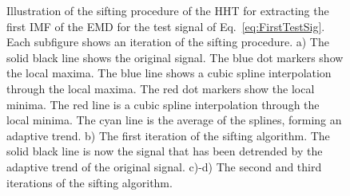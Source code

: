 \documentclass[a4paper]{IEEEtran}
\begin{document}
\begin{figure}[ht]
	\centering
	\label{fig:HHTDemo}
	\caption{Illustration of the sifting procedure of the HHT for extracting the first IMF of the EMD for the test signal of Eq.~\ref{eq:FirstTestSig}. Each subfigure shows an iteration of the sifting procedure. a) The solid black line shows the original signal. The blue dot markers show the local maxima. The blue line shows a cubic spline interpolation through the local maxima. The red dot markers show the local minima. The red line is a cubic spline interpolation through the local minima. The cyan line is the average of the splines, forming an adaptive trend. b) The first iteration of the sifting algorithm. The solid black line is now the signal that has been detrended by the adaptive trend of the original signal. c)-d) The second and third iterations of the sifting algorithm.}
\end{figure}
\end{document}
